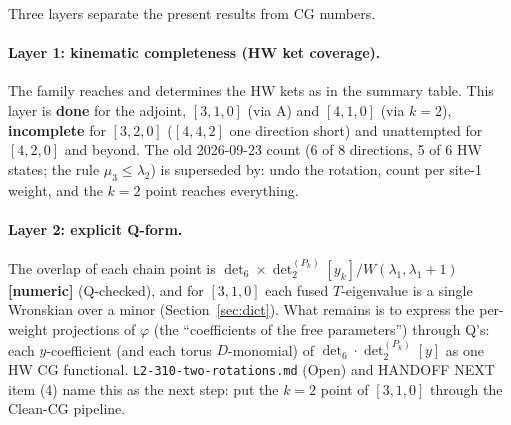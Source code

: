 \documentclass[11pt]{article}
\newcommand{\nm}{\textbf{[numeric]}}
\newcommand{\nb}[1]{\texttt{#1}}
\begin{document}
Three layers separate the present results from CG numbers.

\paragraph{Layer 1: kinematic completeness (HW ket coverage).} The family reaches and determines the HW kets as in the summary table. This layer is \textbf{done} for the adjoint, $[3,1,0]$ (via A) and $[4,1,0]$ (via $k=2$), \textbf{incomplete} for $[3,2,0]$ ($[4,4,2]$ one direction short) and unattempted for $[4,2,0]$ and beyond. The old 2026-09-23 count (6 of 8 directions, 5 of 6 HW states; the rule $\mu_3\le\lambda_2$) is superseded by: undo the rotation, count per site-1 weight, and the $k=2$ point reaches everything.

\paragraph{Layer 2: explicit Q-form.} The overlap of each chain point is $\det_6\times\det_2^{(P_k)}[y_k]/W(\lambda_1,\lambda_1+1)$ \nm{} (Q-checked), and for $[3,1,0]$ each fused $T$-eigenvalue is a single Wronskian over a minor (Section~\ref{sec:dict}). What remains is to express the per-weight projections of $\varphi$ (the ``coefficients of the free parameters'') through Q's: each $y$-coefficient (and each torus $D$-monomial) of $\det_6\cdot\det_2^{(P_k)}[y]$ as one HW CG functional. \nb{L2-310-two-rotations.md} (Open) and HANDOFF NEXT item (4) name this as the next step: put the $k=2$ point of $[3,1,0]$ through the Clean-CG pipeline.
\end{document}
